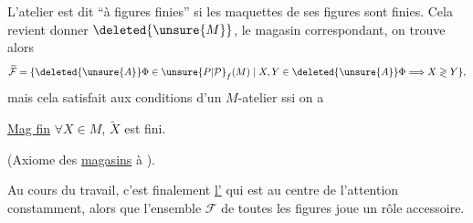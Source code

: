 L'atelier est dit  ``à figures finies'' si les maquettes de ses figures sont finies. Cela revient   donner $\deleted{\unsure{M}}$, le magasin correspondant, on trouve alors
\[
\widetilde{\mathcal{F}}=\{\deleted{\unsure{A}}\Phi\in\unsure{P|\mathcal{P}}_{f}(M)\mid X,Y\in\deleted{\unsure{A}}\Phi\Longrightarrow X\mathrel{\gtrless}Y\},
\]
mais  cela satisfait aux conditions d'un $M$-atelier ssi on a

\par
\uline{Mag fin} $\forall X\in M$, $\widetilde{X}$ est fini.

(Axiome des \uline{magasins} à ).

Au cours du travail,  c'est finalement \uline{l'} qui est au centre de l'attention constamment, alors que l'ensemble $\mathcal{F}$ de toutes les figures joue un rôle  accessoire.
